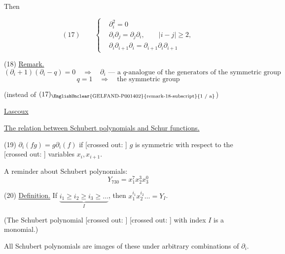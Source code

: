 Then

\begin{equation*}
(17)\qquad
\left\{
\begin{aligned}
&\partial_i^2=0\\
&\partial_i\partial_j=\partial_j\partial_i,\qquad |i-j|\ge2,\\
&\partial_i\partial_{i+1}\partial_i=\partial_{i+1}\partial_i\partial_{i+1}
\end{aligned}
\right.
\end{equation*}

(18) \underline{Remark.}
\begin{equation*}
(\partial_i+1)(\partial_i-q)=0
\quad\Rightarrow\quad
\partial_i\text{ --- a $q$-analogue of the generators of the symmetric group}
\end{equation*}
\begin{equation*}
q=1\quad\Rightarrow\quad\text{the symmetric group}
\end{equation*}

(instead of $(17)_{\text{\EnglishUnclear{GELFAND-P001402}{remark-18-subscript}{1 / a}}}$)

\underline{\underline{Lascoux}}

\underline{The relation between Schubert polynomials and Schur functions.}

(19) $\partial_i(fg)=g\partial_i(f)$ if
[crossed out: ]
$g$ is symmetric with respect to the
[crossed out: ]
variables $x_i,x_{i+1}$.

A reminder about Schubert polynomials:
\begin{equation*}
Y_{730}=x_1^7x_2^3x_3^0
\end{equation*}

(20) \underline{Definition.} If $\underbrace{i_1\ge i_2\ge i_3\ge\ldots}_{I}$, then
$x_1^{i_1}x_2^{i_2}\ldots=Y_I$.

(The Schubert polynomial
[crossed out: ]
[crossed out: ]
with index $I$ is a monomial.)

All Schubert polynomials 
are images of these under arbitrary combinations of $\partial_i$.

